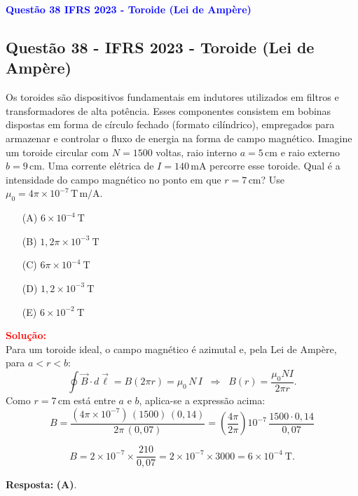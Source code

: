 \begin{flushleft}
\textbf{\textcolor{blue}{\Large Quest\~ao 38 IFRS 2023 - Toroide (Lei de Amp\`ere)}}\\
\noindent

\subsection{Quest\~ao 38 - IFRS 2023 - Toroide (Lei de Amp\`ere)}

Os toroides são dispositivos fundamentais em indutores utilizados em filtros e transformadores de alta potência. Esses componentes consistem em bobinas dispostas em forma de círculo fechado (formato cilíndrico), empregados para armazenar e controlar o fluxo de energia na forma de campo magnético. Imagine um toroide circular com $N=1500$ voltas, raio interno $a=5\,\text{cm}$ e raio externo $b=9\,\text{cm}$. Uma corrente elétrica de $I=140\,\text{mA}$ percorre esse toroide. Qual é a intensidade do campo magnético no ponto em que $r=7\,\text{cm}$? Use $\mu_0=4\pi\times10^{-7}\,\text{T}\,\text{m/A}$.

\begin{itemize}
\item[(A)] $6\times10^{-4}\ \text{T}$
\item[(B)] $1{,}2\pi\times10^{-3}\ \text{T}$
\item[(C)] $6\pi\times10^{-4}\ \text{T}$
\item[(D)] $1{,}2\times10^{-3}\ \text{T}$
\item[(E)] $6\times10^{-2}\ \text{T}$
\end{itemize}

\vspace{0.5cm}

\textcolor{red}{\textbf{Solu\c{c}\~ao:}}\\

Para um toroide ideal, o campo magnético é azimutal e, pela Lei de Ampère, para $a<r<b$:
\[
\oint \vec{B}\cdot d\vec{\ell}=B(2\pi r)=\mu_0\,N\,I
\;\;\Rightarrow\;\;
B(r)=\frac{\mu_0 N I}{2\pi r}.
\]
Como $r=7\,\text{cm}$ está entre $a$ e $b$, aplica-se a expressão acima:
\[
B=\frac{(4\pi\times10^{-7})\,(1500)\,(0{,}14)}{2\pi\,(0{,}07)}
= \left(\frac{4\pi}{2\pi}\right)10^{-7}\,\frac{1500\cdot0{,}14}{0{,}07}
\]

\[
B=2\times10^{-7}\times\frac{210}{0{,}07}
=2\times10^{-7}\times3000
=6\times10^{-4}\ \text{T}.
\]


\textbf{Resposta:} \colorbox{green!50}{\textbf{(A)}}.
\end{flushleft}

